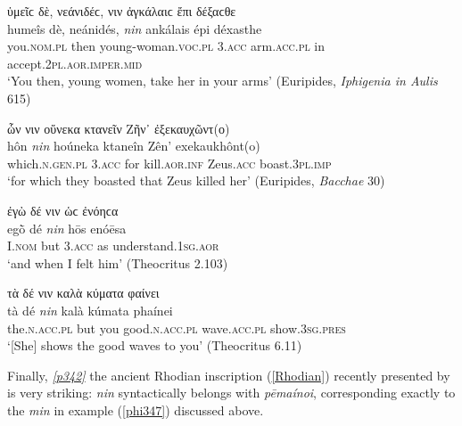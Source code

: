 \begin{exe}
\ex ὑμεῖϲ δὲ, νεάνιδέϲ, {νιν} ἀγκάλαιϲ ἔπι δέξαϲθε\\
\gll humeîs dè, neánidés, \emph{nin} ankálais épi déxasthe\\
you.\textsc{nom.pl} then young-woman.\textsc{voc.pl} \textsc{3.acc} arm.\textsc{acc.pl} in accept.\textsc{2pl.aor.imper.mid}\\
\trans `You then, young women, take her in your arms' (Euripides, \emph{Iphigenia in Aulis} 615)
\label{IphiNin}
\end{exe}

\begin{exe}
\ex ὧν {νιν} οὕνεκα κτανεῖν Ζῆν᾽ ἐξεκαυχῶντ(ο)\\
\gll hôn \emph{nin} hoúneka ktaneîn Zên' exekaukhônt(o)\\
which.\textsc{n.gen.pl} \textsc{3.acc} for kill.\textsc{aor.inf} Zeus.\textsc{acc} boast.\textsc{3pl.imp}\\
\trans `for which they boasted that Zeus killed her' (Euripides, \emph{Bacchae} 30)
\label{BacchNin}
\end{exe}

\begin{exe}
\ex ἐγὼ δέ {νιν} ὡϲ ἐνόηϲα\\
\gll egṑ dé \emph{nin} hōs enóēsa\\
I.\textsc{nom} but \textsc{3.acc} as understand.\textsc{1sg.aor}\\
\trans `and when I felt him' (Theocritus 2.103)
\label{TheoNin1}
\end{exe}

\begin{exe}
\ex τὰ δέ {νιν} καλὰ κύματα φαίνει\\
\gll tà dé \emph{nin} kalà kúmata phaínei\\
the.\textsc{n.acc.pl} but you good.\textsc{n.acc.pl} wave.\textsc{acc.pl} show.\textsc{3sg.pres}\\
\trans `[She] shows the good waves to you' (Theocritus 6.11)
\label{TheoNin2}
\end{exe}

Finally, \hyperlink{p342}{\emph{[p342]}} the ancient Rhodian inscription (\ref{Rhodian}) recently presented by \citet{Selivanov1891} is very striking: \emph{nin} syntactically belongs with \emph{pēmaínoi}, corresponding exactly to the \emph{min} in example (\ref{phi347}) discussed above.

